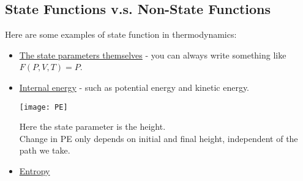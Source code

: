 \documentclass[class=article, crop=false, 12pt]{standalone}
\begin{document}
\subsection{State Functions v.s. Non-State Functions}

Here are some examples of state function in thermodynamics:
\begin{itemize}
    \item \ul{The state parameters themselves} - you can always write something like $F(P,V,T)=P$.
    
    \item \ul{Internal energy} - such as potential energy and kinetic energy. 
    
    \begin{center}
        \begin{minipage}{0.12\linewidth}
            \centering
            \texttt{[image: PE]}
        \end{minipage}
        \begin{minipage}{0.7\linewidth}
            \centering
            Here the state parameter is the height.\\
            Change in PE only depends on initial and final height,
            independent of the path we take.
        \end{minipage}
    \end{center}

    \item \ul{Entropy} 
    
\end{itemize}
\end{document}
